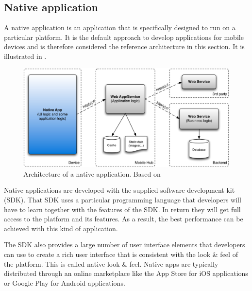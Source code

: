 \subsection{Native application}

A native application is an application that is specifically designed to run on a particular platform. It is the default approach to develop applications for mobile devices and is therefore considered the reference architecture in this section. It is illustrated in . 

\begin{figure}[h]
    \begin{center}
        \includegraphics[width=\textwidth]{figs/native.pdf}
        \caption{Architecture of a native application. Based on \cite{Friese}}
        \label{fig:native}
    \end{center}
\end{figure}

Native applications are developed with the supplied software development kit (SDK). That SDK uses a particular programming language that developers will have to learn together with the features of the SDK. In return they will get full access to the platform and its features. As a result, the best performance can be achieved with this kind of application.

The SDK also provides a large number of user interface elements that developers can use to create a rich user interface that is consistent with the look \& feel of the platform. This is called native look \& feel. Native apps are typically distributed through an online marketplace like the App Store for iOS applications or Google Play for Android applications. 



